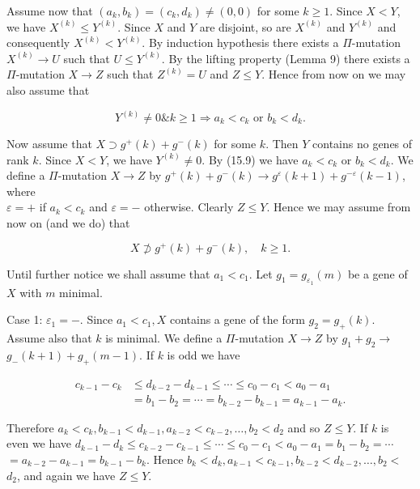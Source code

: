 \documentclass[10pt]{article}
\begin{document}
Assume now that $\left(a_{k}, b_{k}\right)=\left(c_{k}, d_{k}\right) \neq(0,0)$ for some $k \geqslant 1$. Since $X<Y$, we have $X^{(k)} \leqslant Y^{(k)}$. Since $X$ and $Y$ are disjoint, so are $X^{(k)}$ and $Y^{(k)}$ and consequently $X^{(k)}<Y^{(k)}$. By induction hypothesis there exists a $\Pi$-mutation $X^{(k)} \rightarrow U$ such that $U \leqslant Y^{(k)}$. By the lifting property (Lemma 9) there exists a $\Pi$-mutation $X \rightarrow Z$ such that $Z^{(k)}=U$ and $Z \leqslant Y$. Hence from now on we may also assume that


\begin{equation*}
Y^{(k)} \neq 0 \& k \geqslant 1 \Rightarrow a_{k}<c_{k} \text { or } b_{k}<d_{k} . \tag{15.9}
\end{equation*}


Now assume that $X \supset g^{+}(k)+g^{-}(k)$ for some $k$. Then $Y$ contains no genes of rank $k$. Since $X<Y$, we have $Y^{(k)} \neq 0$. By (15.9) we have $a_{k}<c_{k}$ or $b_{k}<d_{k}$. We define a $\Pi$-mutation $X \rightarrow Z$ by $g^{+}(k)+g^{-}(k) \rightarrow g^{\varepsilon}(k+1)+g^{-\varepsilon}(k-1)$, where\\
$\varepsilon=+$ if $a_{k}<c_{k}$ and $\varepsilon=-$ otherwise. Clearly $Z \leqslant Y$. Hence we may assume from now on (and we do) that


\begin{equation*}
X \not \supset g^{+}(k)+g^{-}(k), \quad k \geqslant 1 . \tag{15.10}
\end{equation*}


Until further notice we shall assume that $a_{1}<c_{1}$. Let $g_{1}=g_{\varepsilon_{1}}(m)$ be a gene of $X$ with $m$ minimal.

Case 1: $\varepsilon_{1}=-$. Since $a_{1}<c_{1}, X$ contains a gene of the form $g_{2}=g_{+}(k)$. Assume also that $k$ is minimal. We define a $\Pi$-mutation $X \rightarrow Z$ by $g_{1}+g_{2} \rightarrow$ $g_{-}(k+1)+g_{+}(m-1)$. If $k$ is odd we have

$$
\begin{aligned}
c_{k-1}-c_{k} & \leqslant d_{k-2}-d_{k-1} \leqslant \cdots \leqslant c_{0}-c_{1}<a_{0}-a_{1} \\
& =b_{1}-b_{2}=\cdots=b_{k-2}-b_{k-1}=a_{k-1}-a_{k} .
\end{aligned}
$$

Therefore $a_{k}<c_{k}, b_{k-1}<d_{k-1}, a_{k-2}<c_{k-2}, \ldots, b_{2}<d_{2}$ and so $Z \leqslant Y$. If $k$ is even we have $d_{k-1}-d_{k} \leqslant c_{k-2}-c_{k-1} \leqslant \cdots \leqslant c_{0}-c_{1}<a_{0}-a_{1}=b_{1}-b_{2}=\cdots$ $=a_{k-2}-a_{k-1}=b_{k-1}-b_{k}$. Hence $b_{k}<d_{k}, a_{k-1}<c_{k-1}, b_{k-2}<d_{k-2}, \ldots, b_{2}<$ $d_{2}$, and again we have $Z \leqslant Y$.
\end{document}
